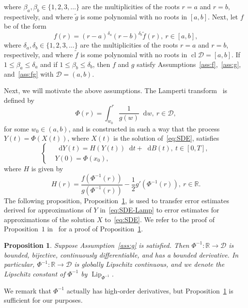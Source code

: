 \documentclass[11pt]{amsart}
\newtheorem{proposition}[theorem]{Proposition}
\newcommand*\diff{\mathop{}\!\mathrm{d}}
\newcommand{\D}{\mathcal{D}}
\newcommand{\CD}{\operatorname{cl} \D}
\newcommand{\Lip}{\operatorname{Lip}}
\begin{document}
{\begin{equation*}
\end{equation*}
where $\beta_{a}, \beta_{b} \in \{ 1,2,3,\ldots \}$ are the multiplicities of the roots $r=a$ and $r=b$, respectively, and where $\tilde{g}$ is some polynomial with no roots in $[a,b]$. Next, let $f$ be of the form
\begin{equation*}
f(r) = (r-a)^{\delta_{a}} (r-b)^{\delta_{b}} \tilde{f}(r),\ r \in [a,b],
\end{equation*}
where $\delta_{a}, \delta_{b} \in \{ 1,2,3,\ldots \}$ are the multiplicities of the roots $r=a$ and $r=b$, respectively, and where $\tilde{f}$ is some polynomial with no roots in $\CD = [a,b]$. If $1 \leq \beta_{a} \leq \delta_{a}$ and if $1 \leq \beta_{b} \leq \delta_{b}$, then $f$ and $g$ satisfy Assumptions~\ref{ass:f},~\ref{ass:g}, and~\ref{ass:fg} with $\D = (a,b)$.

Next, we will motivate the above assumptions. The Lamperti transform~\cite{MR176536} is defined by
\begin{equation}\label{eq:LampTrans}
\Phi(r) = \int_{w_{0}}^{r} \frac{1}{g(w)} \diff w,\ r \in \D,
\end{equation}
for some $w_{0} \in (a,b)$, and is constructed in such a way that the process $Y(t) = \Phi(X(t))$, where $X(t)$ is the solution of~\eqref{eq:SDE}, satisfies
\begin{equation}\label{eq:SDE-Lamp}
\left\lbrace
\begin{aligned}
& \diff Y(t) = H(Y(t)) \diff t + \diff B(t),\ t \in [0,T], \\
& Y(0) = \Phi(x_{0}),
\end{aligned}
\right.
\end{equation}
where $H$ is given by
\begin{equation}\label{eq:Lamp_drift}
H(r) = \frac{f(\Phi^{-1}(r))}{g(\Phi^{-1}(r))} - \frac{1}{2} g'(\Phi^{-1}(r)),\ r \in \mathbb{R}.
\end{equation}
The following proposition, Proposition~\ref{prop:phiinv}, is used to transfer error estimates derived for approximations of $Y$ in~\eqref{eq:SDE-Lamp} to error estimates for approximations of the solution $X$ to~\eqref{eq:SDE}. We refer to the proof of Proposition~$1$ in~\cite{MR4737060} for a proof of Proposition~\ref{prop:phiinv}.
\begin{proposition}\label{prop:phiinv}
Suppose Assumption~\ref{ass:g} is satisfied. Then $\Phi^{-1}: \mathbb{R} \to \D$ is bounded, bijective, continuously differentiable, and has a bounded derivative. In particular, $\Phi^{-1}: \mathbb{R} \to \D$ is globally Lipschitz continuous, and we denote the Lipschitz constant of $\Phi^{-1}$ by $\Lip_{\Phi^{-1}}$.
\end{proposition}
We remark that $\Phi^{-1}$ actually has high-order derivatives, but Proposition~\ref{prop:phiinv} is sufficient for our purposes.

}
\end{document}
